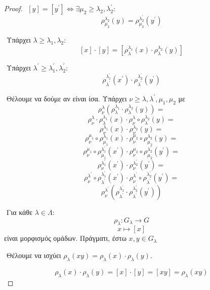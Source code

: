 \begin{proof}
    $ $\newline
    $[y]=[y^{\prime}] \iff \exists \mu_2 \geq \lambda_2,\lambda^{\prime}_2:$
    $$\rho^{\lambda_2}_{\mu_2}(y) = \rho^{\lambda^{\prime}_2}_{\mu_2}(y^{\prime})$$

    $ $\newline
    Υπάρχει $\lambda \geq \lambda_1,\lambda_2$:
    $$[x]\cdot[y] = [\rho^{\lambda_1}_{\lambda}(x) \cdot \rho^{\lambda_2}_{\lambda}(y)]$$

    $ $\newline
    Υπάρχει $\lambda^{\prime} \geq \lambda^{\prime}_1,\lambda^{\prime}_2:$
    $$\rho^{\lambda^{\prime}_1}_{\lambda^{\prime}}(x^{\prime}) \cdot \rho^{\lambda^{\prime}_2}_{\lambda^{\prime}} (y^{\prime})$$

    $ $\newline
    Θέλουμε να δούμε αν είναι ίσα. Υπάρχει $\nu \geq \lambda,\lambda^{\prime},\mu_1,\mu_2$ με 
    $$\rho^{\lambda}_{\nu} ( \rho^{\lambda_1}_{\lambda} \cdot \rho^{\lambda_2}_{\lambda}(y)) = $$
    $$\rho^{\lambda}_{\nu} \cdot \rho^{\lambda_1}_{\lambda} (x) \cdot \rho^{\lambda}_{\nu}\circ \rho^{\lambda_2}_{\lambda}(y) = $$
    $$\rho^{\lambda_1}_{\nu}(x) \cdot \rho^{\lambda_2}_{\nu}(y) = $$
    $$\rho^{\mu_1}_{\nu}\circ \rho^{\lambda_1}_{\mu_1}(x) \cdot \rho^{\mu_2}_{\nu}\circ \rho^{\lambda_2}_{\mu_2} (y) = $$
    $$\rho^{\mu_1}_{\nu} \circ \rho^{\lambda^{\prime}_1}_{\mu_1}(x^{\prime}) \cdot \rho^{\mu_2}_{\nu} \circ \rho^{\lambda^{\prime}_2}_{\mu_2} (y^{\prime}) = $$
    $$\rho^{\lambda^{\prime}_1}_{\nu} (x^{\prime}) \cdot \rho^{\lambda^{\prime}_2}_{\nu}(y^{\prime}) = $$
    $$\rho^{\lambda^{\prime}}_{\nu}\circ \rho^{\lambda^{\prime}_1}_{\lambda^{\prime}} (x^{\prime}) \cdot \rho^{\lambda^{\prime}}_{\nu} \circ \rho^{\lambda^{\prime}_2}_{\lambda^{\prime}} (y^{\prime}) = $$
    $$\rho^{\lambda^{\prime}}_{\nu} ( \rho^{\lambda^{\prime}_1}_{\lambda^{\prime}} \cdot \rho^{\lambda^{\prime}_2}_{\lambda^{\prime}}(y^{\prime}))$$

    $ $\newline
    Για κάθε $\lambda \in \Lambda:$
    $$\rho_{\lambda}: G_{\lambda} \rightarrow G$$
    $$x \mapsto [x] $$ είναι μορφισμός ομάδων. Πράγματι, έστω $x,y \in G_{\lambda}$

    $ $\newline
    Θέλουμε να ισχύει $\rho_{\lambda}(xy) = \rho_{\lambda}(x) \cdot \rho_{\lambda}(y)$.

    $$\rho_{\lambda}(x)\cdot \rho_{\lambda}(y) = [x]\cdot [y] = [xy] = \rho_{\lambda} (xy)$$


\end{proof}


